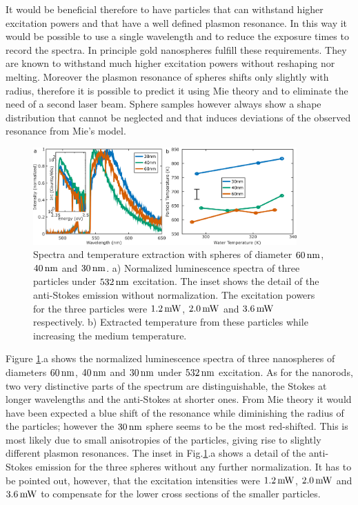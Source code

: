 It would be beneficial therefore to have particles that can withstand higher
excitation powers and that have a well defined plasmon resonance. In this way it
would be possible to use a single wavelength and to reduce the exposure times to
record the spectra. In principle gold nanospheres fulfill these requirements.
They are known to withstand much higher excitation powers without reshaping nor
melting\cite{Hou2015}. Moreover the plasmon resonance of spheres shifts only
slightly with radius, therefore it is possible to predict it using Mie theory
and to eliminate the need of a second laser beam. Sphere samples however
always show a shape distribution that cannot be neglected\cite{Lee2013} and that
induces deviations of the observed resonance from Mie's model.

\begin{figure}[htp] \centering
\includegraphics[width=0.90\textwidth]{Chapters/04_Anti-Stokes/Figures/07_Spheres/07_spheres.png}
\caption{Spectra and temperature extraction with spheres of
diameter $60\,\textrm{nm}$, $40\,\textrm{nm}$ and $30\,\textrm{nm}$. a) Normalized luminescence spectra of
three particles under $532\,\textrm{nm}$ excitation. The inset shows the detail of the
anti-Stokes emission without normalization. The excitation powers for the three
particles were $1.2\,\textrm{mW}$, $2.0\,\textrm{mW}$ and $3.6\,\textrm{mW}$ respectively. b) Extracted
temperature from these particles while increasing the medium temperature.}
	\label{fig:spheres}
\end{figure}

Figure \ref{fig:spheres}.a shows the normalized luminescence spectra of three
nanospheres of diameters $60\,\textrm{nm}$, $40\,\textrm{nm}$ and $30\,\textrm{nm}$ under $532\,\textrm{nm}$ excitation.
As for the nanorods, two very distinctive parts of the spectrum are
distinguishable, the Stokes at longer wavelengths and the anti-Stokes at shorter
ones. From Mie theory it would have been expected a blue shift of the resonance
while diminishing the radius of the particles; however the $30\,\textrm{nm}$ sphere seems
to be the most red-shifted. This is most likely due to small anisotropies of the
particles, giving rise to slightly different plasmon resonances. The inset in
Fig.\ref{fig:spheres}.a shows a detail of the anti-Stokes emission for the three
spheres without any further normalization. It has to be pointed out, however,
that the excitation intensities were $1.2\,\textrm{mW}$, $2.0\,\textrm{mW}$ and $3.6\,\textrm{mW}$ to
compensate for the lower cross sections of the smaller particles.

